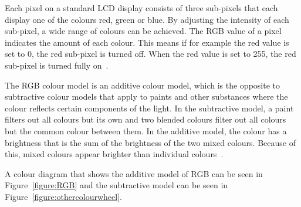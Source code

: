 \documentclass[../MasterThesis.tex]{subfiles}
\begin{document}
Each pixel on a standard LCD display consists of three sub-pixels that each display one of the colours red, green or blue. By adjusting the intensity of each sub-pixel, a wide range of colours can be achieved. 
The RGB value of a pixel indicates the amount of each colour. This means if for example the red value is set to 0, the red sub-pixel is turned off. When the red value is set to 255, the red sub-pixel is turned fully on~\cite{colourRGB, lcd}.

The RGB colour model is an additive colour model, which is the opposite to subtractive colour models that apply to paints and other substances where the colour reflects certain components of the light. 
In the subtractive model, a paint filters out all colours but its own and two blended colours filter out all colours but the common colour between them. In the additive model, the colour has a brightness that is the sum of the brightness of the two mixed colours. Because of this, mixed colours appear brighter than individual colours~\cite{colourRGB}.

A colour diagram that shows the additive model of RGB can be seen in Figure~\ref{figure:RGB} and the subtractive model can be seen in Figure~\ref{figure:othercolourwheel}.
\end{document}
